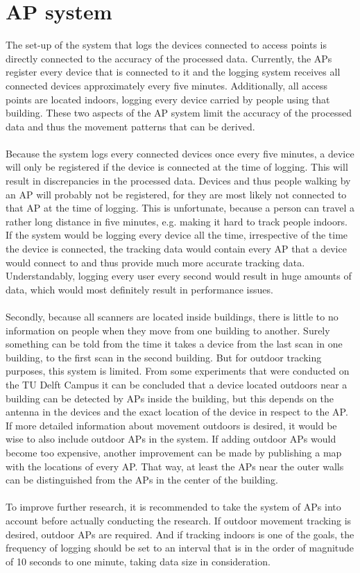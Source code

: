 \section{AP system}
The set-up of the system that logs the devices connected to access points is directly connected to the accuracy of the processed data. Currently, the APs register every device that is connected to it and the logging system receives all connected devices approximately every five minutes. Additionally, all access points are located indoors, logging every device carried by people using that building. These two aspects of the AP system limit the accuracy of the processed data and thus the movement patterns that can be derived. \\\\
Because the system logs every connected devices once every five minutes, a device will only be registered if the device is connected at the time of logging. This will result in discrepancies in the processed data. Devices and thus people walking by an AP will probably not be registered, for they are most likely not connected to that AP at the time of logging. This is unfortunate, because a person can travel a rather long distance in five minutes, e.g. making it hard to track people indoors. If the system would be logging every device all the time, irrespective of the time the device is connected, the tracking data would contain every AP that a device would connect to and thus provide much more accurate tracking data. Understandably, logging every user every second would result in huge amounts of data, which would most definitely result in performance issues.\\\\
Secondly, because all scanners are located inside buildings, there is little to no information on people when they move from one building to another. Surely something can be told from the time it takes a device from the last scan in one building, to the first scan in the second building. But for outdoor tracking purposes, this system is limited. From some experiments that were conducted on the TU Delft Campus it can be concluded that a device located outdoors near a building can be detected by APs inside the building, but this depends on the antenna in the devices and the exact location of the device in respect to the AP. If more detailed information about movement outdoors is desired, it would be wise to also include outdoor APs in the system. If adding outdoor APs would become too expensive, another improvement can be made by publishing a map with the locations of every AP. That way, at least the APs near the outer walls can be distinguished from the APs in the center of the building.\\\\
To improve further research, it is recommended to take the system of APs into account before actually conducting the research. If outdoor movement tracking is desired, outdoor APs are required. And if tracking indoors is one of the goals, the frequency of logging should be set to an interval that is in the order of magnitude of 10 seconds to one minute, taking data size in consideration.

